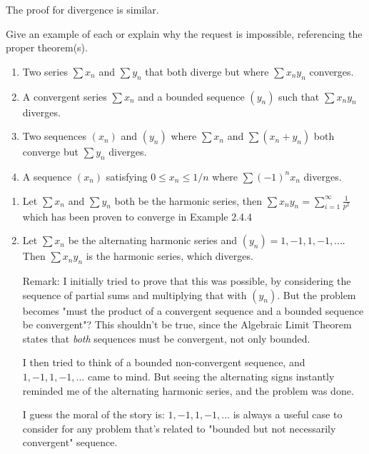 \documentclass{oxmathproblems}
\begin{document}
\begin{questions}
\begin{solution}
\begin{itemize}
    The proof for divergence is similar.
  \end{itemize}
\end{solution}

\miquestion Give an example of each or explain why the request is impossible, referencing the proper theorem(s).
\begin{enumerate}[label=(\alph*)]
    \item Two series $\sum x_{n}$ and $\sum y_{n}$ that both diverge but where $\sum x_{n}y_{n}$ converges.
    \item A convergent series $\sum x_{n}$ and a bounded sequence $(y_{n})$ such that $\sum x_{n}y_{n}$ diverges.
    \item Two sequences $(x_{n})$ and $(y_{n})$ where $\sum x_{n}$ and $\sum (x_{n}+y_{n})$ both converge but $\sum y_{n}$ diverges.
    \item A sequence $(x_{n})$ satisfying $0 \leq x_{n} \leq 1/n$ where $\sum (-1)^{n}x_{n}$ diverges.
\end{enumerate}

\begin{solution}
  \begin{enumerate}[label=(\alph*)]
    \item Let $\sum x_{n}$ and $\sum y_{n}$ both be the harmonic series, then $\sum x_{n}y_{n} = \sum_{i=1}^{\infty} \frac{1}{p^2}$ which has been proven to converge in
    Example 2.4.4

    \item Let $\sum x_{n}$ be the alternating harmonic series and $(y_{n}) = 1, -1, 1, -1, ...$. Then $\sum x_{n}y_{n}$ is the harmonic series, which diverges.
    
    Remark: I initially tried to prove that this was possible, by considering the sequence of partial sums and multiplying that with $(y_{n})$. But the problem becomes
    "must the product of a convergent sequence and a bounded sequence be convergent"? This shouldn't be true, since the Algebraic Limit Theorem states that \textit{both}
    sequences must be convergent, not only bounded.

    I then tried to think of a bounded non-convergent sequence, and $1, -1, 1, -1, ...$ came to mind. But seeing the alternating signs instantly reminded me of the
    alternating harmonic series, and the problem was done.

    I guess the moral of the story is: $1, -1, 1, -1, ...$ is always a useful case to consider for any problem that's related to "bounded but not necessarily convergent" sequence.
  

\end{enumerate}
\end{solution}
\end{questions}
\end{document}
